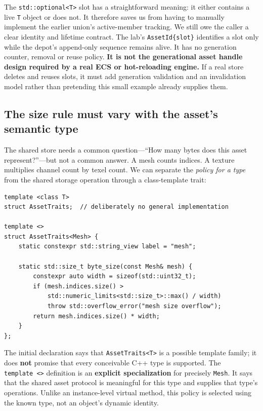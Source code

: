 The \texttt{std::optional\textless{}T\textgreater{}} slot has a straightforward meaning: it either contains a live \texttt{T} object or does not. It therefore saves us from having to manually implement the earlier union's active-member tracking. We still owe the caller a clear identity and lifetime contract. The lab's \texttt{AssetId\{slot\}} identifies a slot only while the depot's append-only sequence remains alive. It has no generation counter, removal or reuse policy. \textbf{It is not the generational asset handle design required by a real ECS or hot-reloading engine.} If a real store deletes and reuses slots, it must add generation validation and an invalidation model rather than pretending this small example already supplies them.

\subsection{The size rule must vary with the asset's semantic type}\label{05-engine-i-ch005-the-size-rule-must-vary-with-the-assets-semantic-type}

The shared store needs a common question---``How many bytes does this asset represent?''---but not a common answer. A mesh counts indices. A texture multiplies channel count by texel count. We can separate the \emph{policy for a type} from the shared storage operation through a class-template trait:

\begin{verbatim}
template <class T>
struct AssetTraits;  // deliberately no general implementation

template <>
struct AssetTraits<Mesh> {
    static constexpr std::string_view label = "mesh";

    static std::size_t byte_size(const Mesh& mesh) {
        constexpr auto width = sizeof(std::uint32_t);
        if (mesh.indices.size() >
            std::numeric_limits<std::size_t>::max() / width)
            throw std::overflow_error("mesh size overflow");
        return mesh.indices.size() * width;
    }
};
\end{verbatim}

The initial declaration says that \texttt{AssetTraits\textless{}T\textgreater{}} is a possible template family; it does \textbf{not} promise that every conceivable C++ type is supported. The \texttt{template\ \textless{}\textgreater{}} definition is an \textbf{explicit specialization} for precisely \texttt{Mesh}. It says that the shared asset protocol is meaningful for this type and supplies that type's operations. Unlike an instance-level virtual method, this policy is selected using the known type, not an object's dynamic identity.

